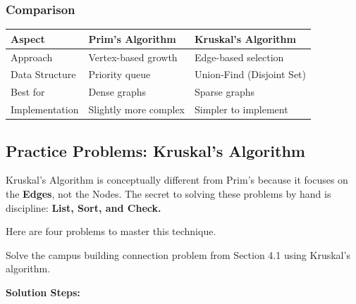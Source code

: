 \documentclass[
  letterpaper,
  DIV=11,
  numbers=noendperiod]{scrreprt}
\begin{document}
\subsubsection{Comparison}\label{comparison}

\begin{longtable}[]{@{}lll@{}}
\toprule\noalign{}
Aspect & Prim's Algorithm & Kruskal's Algorithm \\
\midrule\noalign{}
\endhead
\bottomrule\noalign{}
\endlastfoot
Approach & Vertex-based growth & Edge-based selection \\
Data Structure & Priority queue & Union-Find (Disjoint Set) \\
Best for & Dense graphs & Sparse graphs \\
Implementation & Slightly more complex & Simpler to implement \\
\end{longtable}

\subsection{Practice Problems: Kruskal's
Algorithm}\label{practice-problems-kruskals-algorithm}

Kruskal's Algorithm is conceptually different from Prim's because it
focuses on the \textbf{Edges}, not the Nodes. The secret to solving
these problems by hand is discipline: \textbf{List, Sort, and Check.}

Here are four problems to master this technique.

Solve the campus building connection problem from Section 4.1 using
Kruskal's algorithm.

\textbf{Solution Steps:}
\end{document}
